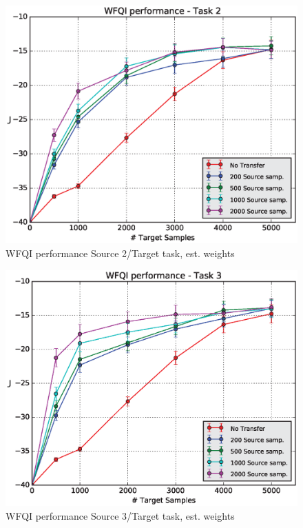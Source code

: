     \begin{figure}[H]
      \raggedbottom
      \centering
      \includegraphics[scale=0.5]{images/WFQIPerf2_V2.eps}
      \caption{WFQI performance Source 2/Target task, est. weights}
      \label{perf2V2}
    \end{figure}

    \begin{figure}[H]
      \raggedbottom
      \centering
      \includegraphics[scale=0.5]{images/WFQIPerf3_V2.eps}
      \caption{WFQI performance Source 3/Target task, est. weights}
      \label{perf3V2}
    \end{figure}


